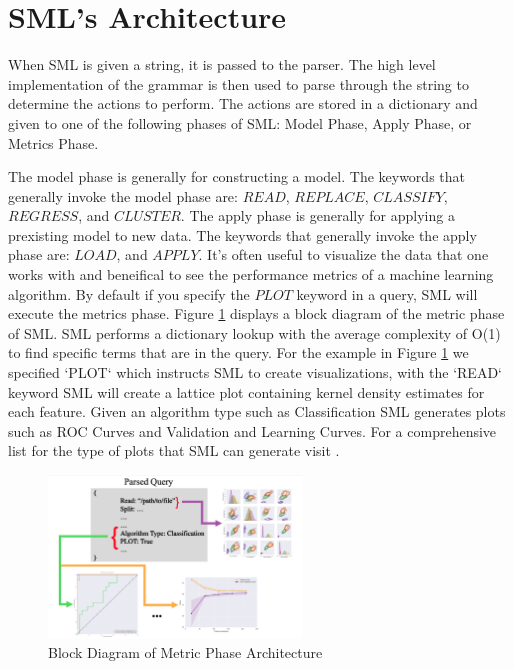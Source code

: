 \documentclass[jair,twoside,11pt,theapa]{article}
\begin{document}
\section{SML's Architecture}
\label{sml-architecture}

When SML is given a string, it is passed to the parser. The high level implementation of the grammar is then used to parse through the string to determine the actions to perform. The actions are stored in a dictionary and given to one of the following phases of SML: Model Phase, Apply Phase, or Metrics Phase.


The model phase is generally for constructing a model. The keywords that generally invoke the model phase are: \(READ\), \(REPLACE\), \(CLASSIFY\), \(REGRESS\), and \(CLUSTER\). The apply phase is generally for applying a prexisting model  to new data. The keywords that generally invoke the apply phase are: \(LOAD\), and \(APPLY\). It's often useful to visualize the data that one works with and beneifical to see the performance metrics of a machine learning algorithm. By default if you specify the \(PLOT\) keyword in a query, SML will execute the metrics phase. Figure \ref{fig:metric-phase} displays a block diagram of the metric phase of SML. SML performs a dictionary lookup with the average complexity of O(1) to find specific terms that are in the query. For the example in Figure \ref{fig:metric-phase} we specified `PLOT` which instructs SML to create visualizations, with the `READ` keyword SML will create a lattice plot containing kernel density estimates for each feature. Given an algorithm type such as Classification SML generates plots such as ROC Curves and Validation and Learning Curves. For a comprehensive list for the type of plots that SML can generate visit  \cite{}.

\begin{figure}
\includegraphics[width=0.6\textwidth]{figs/metric-phase.png}
\centering
\caption{Block Diagram of Metric Phase Architecture}
\label{fig:metric-phase}
\end{figure}
\end{document}
